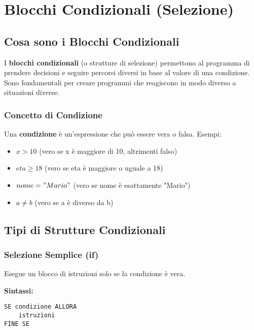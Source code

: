 \documentclass[a4paper,16pt]{article}
\begin{document}
\section{Blocchi Condizionali (Selezione)}

\subsection{Cosa sono i Blocchi Condizionali}

I \textbf{blocchi condizionali} (o strutture di selezione) permettono al programma di prendere decisioni e seguire percorsi diversi in base al valore di una condizione. Sono fondamentali per creare programmi che reagiscono in modo diverso a situazioni diverse.

\subsubsection{Concetto di Condizione}

Una \textbf{condizione} è un'espressione che può essere vera o falsa. Esempi:
\begin{itemize}[leftmargin=*]
    \item $x > 10$ (vero se x è maggiore di 10, altrimenti falso)
    \item $eta \geq 18$ (vero se eta è maggiore o uguale a 18)
    \item $nome = "Mario"$ (vero se nome è esattamente "Mario")
    \item $a \neq b$ (vero se a è diverso da b)
\end{itemize}

\subsection{Tipi di Strutture Condizionali}

\subsubsection{Selezione Semplice (if)}

Esegue un blocco di istruzioni solo se la condizione è vera.

\textbf{Sintassi:}
\begin{lstlisting}
SE condizione ALLORA
    istruzioni
FINE SE
\end{lstlisting}

\begin{center}
\end{center}
\end{document}
